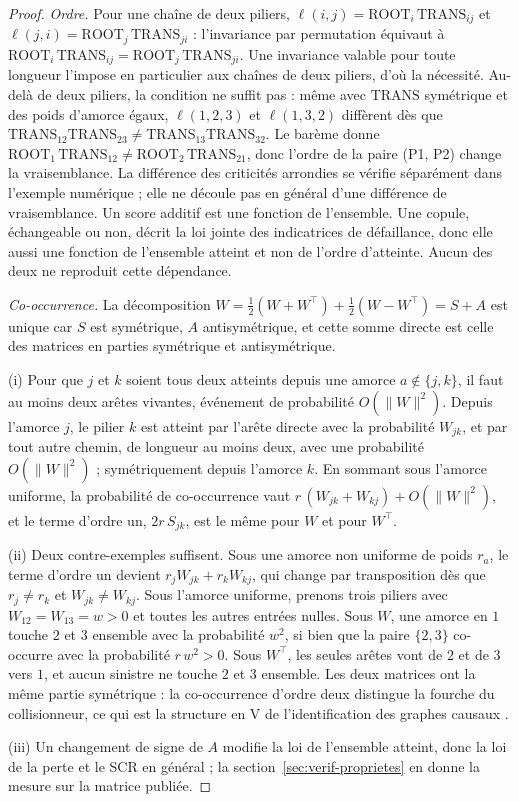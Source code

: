 \begin{proof}
\emph{Ordre.} Pour une chaîne de deux piliers, $\ell(i,j)=\mathrm{ROOT}_i\,\mathrm{TRANS}_{ij}$ et
$\ell(j,i)=\mathrm{ROOT}_j\,\mathrm{TRANS}_{ji}$ : l'invariance par permutation équivaut à
$\mathrm{ROOT}_i\,\mathrm{TRANS}_{ij}=\mathrm{ROOT}_j\,\mathrm{TRANS}_{ji}$. Une invariance valable
pour toute longueur l'impose en particulier aux chaînes de deux piliers, d'où la nécessité. Au-delà
de deux piliers, la condition ne suffit pas : même avec $\mathrm{TRANS}$ symétrique et des poids
d'amorce égaux, $\ell(1,2,3)$ et $\ell(1,3,2)$ diffèrent dès que
$\mathrm{TRANS}_{12}\mathrm{TRANS}_{23}\neq\mathrm{TRANS}_{13}\mathrm{TRANS}_{32}$. Le barème donne
$\mathrm{ROOT}_1\,\mathrm{TRANS}_{12}\neq\mathrm{ROOT}_2\,\mathrm{TRANS}_{21}$, donc l'ordre de la paire (P1, P2) change la vraisemblance. La différence des criticités arrondies se vérifie séparément dans l'exemple numérique ; elle ne découle pas en général d'une différence de vraisemblance. Un
score additif est une fonction de l'ensemble. Une copule, échangeable ou non, décrit la loi jointe
des indicatrices de défaillance, donc elle aussi une fonction de l'ensemble atteint et non de
l'ordre d'atteinte. Aucun des deux ne reproduit cette dépendance.

\emph{Co-occurrence.} La décomposition $W=\tfrac12(W+W^\top)+\tfrac12(W-W^\top)=S+A$ est
unique car $S$ est symétrique, $A$ antisymétrique, et cette somme directe est celle des
matrices en parties symétrique et antisymétrique.

(i) Pour que $j$ et $k$ soient tous deux atteints depuis une amorce $a\notin\{j,k\}$, il faut au
moins deux arêtes vivantes, événement de probabilité $O(\lVert W\rVert^2)$. Depuis l'amorce $j$,
le pilier $k$ est atteint par l'arête directe avec la probabilité $W_{jk}$, et par tout autre
chemin, de longueur au moins deux, avec une probabilité $O(\lVert W\rVert^2)$ ; symétriquement
depuis l'amorce $k$. En sommant sous l'amorce uniforme, la probabilité de co-occurrence vaut
$r\,(W_{jk}+W_{kj})+O(\lVert W\rVert^2)$, et le terme d'ordre un, $2r\,S_{jk}$, est le même pour
$W$ et pour $W^\top$.

(ii) Deux contre-exemples suffisent. Sous une amorce non uniforme de poids $r_a$, le terme
d'ordre un devient $r_j W_{jk}+r_k W_{kj}$, qui change par transposition dès que $r_j\neq r_k$ et
$W_{jk}\neq W_{kj}$. Sous l'amorce uniforme, prenons trois piliers avec $W_{12}=W_{13}=w>0$ et
toutes les autres entrées nulles. Sous $W$, une amorce en $1$ touche $2$ et $3$ ensemble avec la
probabilité $w^2$, si bien que la paire $\{2,3\}$ co-occurre avec la probabilité $r\,w^2>0$. Sous
$W^\top$, les seules arêtes vont de $2$ et de $3$ vers $1$, et aucun sinistre ne touche $2$ et $3$
ensemble. Les deux matrices ont la même partie symétrique : la co-occurrence d'ordre deux
distingue la fourche du collisionneur, ce qui est la structure en V de l'identification des
graphes causaux \citep{verma1990equivalence}.

(iii) Un changement de signe de $A$ modifie la loi de l'ensemble atteint, donc la loi de la perte
et le SCR en général ; la section~\ref{sec:verif-proprietes} en donne la mesure sur la matrice
publiée.
\end{proof}

